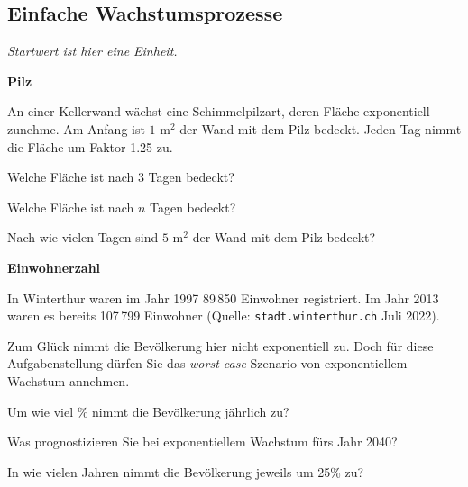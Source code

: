\subsection{Einfache Wachstumsprozesse}
\textit{Startwert ist hier eine Einheit.}


\bbwActAufgabenNr{} \textbf{Pilz}

An einer Kellerwand wächst eine Schimmelpilzart, deren Fläche
exponentiell zunehme.
Am Anfang ist $1 \textrm{ m}^2$ der Wand mit dem Pilz bedeckt. Jeden Tag nimmt die Fläche um Faktor 1.25 zu.

\begin{bbwAufgabenBlock}
\item Welche Fläche ist nach 3 Tagen bedeckt?
\item Welche Fläche ist nach $n$ Tagen bedeckt?
\item Nach wie vielen Tagen sind $5 \textrm{ m}^2$ der Wand mit dem Pilz bedeckt?
\end{bbwAufgabenBlock}
\platzFuerBerechnungenBisEndeSeite{}



\bbwActAufgabenNr{} \textbf{Einwohnerzahl}

In Winterthur waren im Jahr 1997 89\,850 Einwohner registriert. Im Jahr 2013 waren es
bereits 107\,799 Einwohner (Quelle: \texttt{stadt.winterthur.ch} Juli 2022).

Zum Glück nimmt die Bevölkerung hier nicht exponentiell zu. Doch für
diese Aufgabenstellung dürfen Sie das \textit{worst case}-Szenario von
exponentiellem Wachstum annehmen.

\begin{bbwAufgabenBlock}
\item Um wie viel \% nimmt die Bevölkerung jährlich zu?
\item Was prognostizieren Sie bei exponentiellem Wachstum fürs Jahr 2040?
\item In wie vielen Jahren nimmt die Bevölkerung jeweils um 25\% zu?
\end{bbwAufgabenBlock}
\platzFuerBerechnungenBisEndeSeite{}

